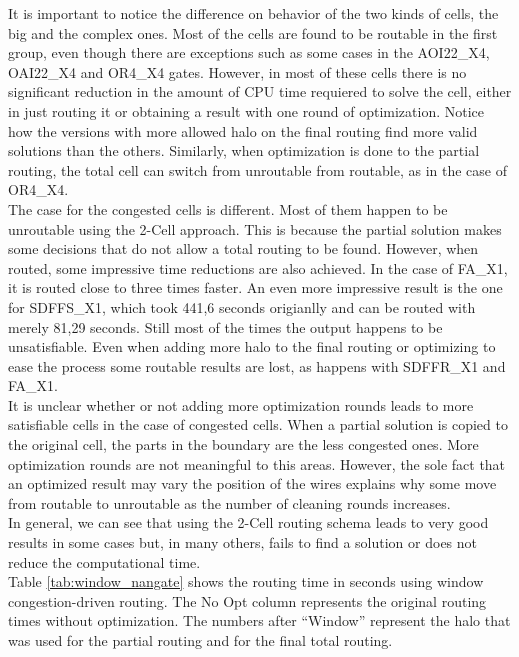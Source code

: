It is important to notice the difference on behavior of the two kinds of cells, the big and the complex ones. Most of the cells are found to be routable in the first group, even though there are exceptions such as some cases in the AOI22\_X4, OAI22\_X4 and OR4\_X4 gates. However, in most of these cells there is no significant reduction in the amount of CPU time requiered to solve the cell, either in just routing it or obtaining a result with one round of optimization.  Notice how the versions with more allowed halo on the final routing find more valid solutions than the others. Similarly, when optimization is done to the partial routing, the total cell can switch from unroutable from routable, as in the case of OR4\_X4. \\

The case for the congested cells is different. Most of them happen to be unroutable using the 2-Cell approach. This is because the partial solution makes some decisions that do not allow a total routing to be found. However, when routed, some impressive time reductions are also achieved. In the case of FA\_X1, it is routed close to three times faster. An even more impressive result is the one for SDFFS\_X1, which took 441,6 seconds origianlly and can be routed with merely 81,29 seconds. Still most of the times the output happens to be unsatisfiable. Even when adding more halo to the final routing or optimizing to ease the process some routable results are lost, as happens with SDFFR\_X1 and FA\_X1. \\

It is unclear whether or not adding more optimization rounds leads to more satisfiable cells in the case of congested cells. When a partial solution is copied to the original cell, the parts in the boundary are the less congested ones. More optimization rounds are not meaningful to this areas. However, the sole fact that an optimized result may vary the position of the wires explains why some move from routable to unroutable as the number of cleaning rounds increases. \\

In general, we can see that using the 2-Cell routing schema leads to very good results in some cases but, in many others, fails to find a solution or does not reduce the computational time. \\

Table \ref{tab:window_nangate} shows the routing time in seconds using window congestion-driven routing. The No Opt column represents the original routing times without optimization. The numbers after ``Window'' represent the halo that was used for the partial routing and for the final total routing. \\


